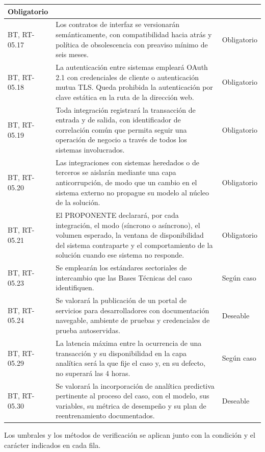 \begin{longtable}{|L{0.098425\AnchoTablaAnexo}|L{0.814961\AnchoTablaAnexo}|L{0.086614\AnchoTablaAnexo}|}
Obligatorio \\ \hline
BT, RT-05.17 &
Los contratos de interfaz se versionarán semánticamente, con compatibilidad hacia atrás y política de obsolescencia con preaviso mínimo de seis meses. &
Obligatorio \\ \hline
{}
BT, RT-05.18 &
La autenticación entre sistemas empleará OAuth 2.1 con credenciales de cliente o autenticación mutua TLS. Queda prohibida la autenticación por clave estática en la ruta de la dirección web. &
Obligatorio \\ \hline
BT, RT-05.19 &
Toda integración registrará la transacción de entrada y de salida, con identificador de correlación común que permita seguir una operación de negocio a través de todos los sistemas involucrados. &
Obligatorio \\ \hline
{}
BT, RT-05.20 &
Las integraciones con sistemas heredados o de terceros se aislarán mediante una capa anticorrupción, de modo que un cambio en el sistema externo no propague su modelo al núcleo de la solución. &
Obligatorio \\ \hline
BT, RT-05.21 &
El PROPONENTE declarará, por cada integración, el modo (síncrono o asíncrono), el volumen esperado, la ventana de disponibilidad del sistema contraparte y el comportamiento de la solución cuando ese sistema no responde. &
Obligatorio \\ \hline
{}
BT, RT-05.23 &
Se emplearán los estándares sectoriales de intercambio que las Bases Técnicas del caso identifiquen. &
Según caso \\ \hline
BT, RT-05.24 &
Se valorará la publicación de un portal de servicios para desarrolladores con documentación navegable, ambiente de pruebas y credenciales de prueba autoservidas. &
Deseable \\ \hline
{}
BT, RT-05.29 &
La latencia máxima entre la ocurrencia de una transacción y su disponibilidad en la capa analítica será la que fije el caso y, en su defecto, no superará las 4 horas. &
Según caso \\ \hline
BT, RT-05.30 &
Se valorará la incorporación de analítica predictiva pertinente al proceso del caso, con el modelo, sus variables, su métrica de desempeño y su plan de reentrenamiento documentados. &
Deseable \\ \hline
\end{longtable}

Los umbrales y los métodos de verificación se aplican junto con la condición y el carácter indicados en cada fila.
